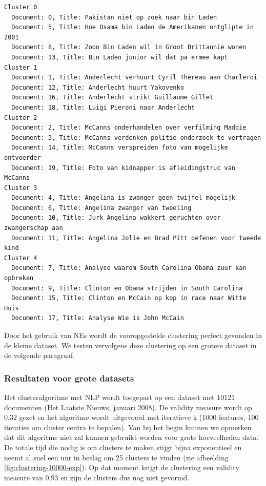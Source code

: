 \begin{lstlisting}
Cluster 0
  Document: 0, Title: Pakistan niet op zoek naar bin Laden
  Document: 5, Title: Hoe Osama bin Laden de Amerikanen ontglipte in 2001
  Document: 8, Title: Zoon Bin Laden wil in Groot Brittannie wonen
  Document: 13, Title: Bin Laden junior wil dat pa ermee kapt
Cluster 1
  Document: 1, Title: Anderlecht verhuurt Cyril Thereau aan Charleroi
  Document: 12, Title: Anderlecht huurt Yakovenko
  Document: 16, Title: Anderlecht strikt Guillaume Gillet
  Document: 18, Title: Luigi Pieroni naar Anderlecht
Cluster 2
  Document: 2, Title: McCanns onderhandelen over verfilming Maddie
  Document: 3, Title: McCanns verdenken politie onderzoek te vertragen
  Document: 14, Title: McCanns verspreiden foto van mogelijke ontvoerder
  Document: 19, Title: Foto van kidnapper is afleidingstruc van McCanns
Cluster 3
  Document: 4, Title: Angelina is zwanger geen twijfel mogelijk
  Document: 6, Title: Angelina zwanger van tweeling
  Document: 10, Title: Jurk Angelina wakkert geruchten over zwangerschap aan
  Document: 11, Title: Angelina Jolie en Brad Pitt oefenen voor tweede kind
Cluster 4
  Document: 7, Title: Analyse waarom South Carolina Obama zuur kan opbreken
  Document: 9, Title: Clinton en Obama strijden in South Carolina
  Document: 15, Title: Clinton en McCain op kop in race naar Witte Huis
  Document: 17, Title: Analyse Wie is John McCain
\end{lstlisting}

Door het gebruik van NEs wordt de vooropgestelde clustering perfect gevonden in de kleine dataset. We testen vervolgens deze clustering op een grotere dataset in de volgende paragraaf.

\subsubsection{Resultaten voor grote datasets}
Het clusteralgoritme met NLP wordt toegepast op een dataset met 10121 documenten (Het Laatste Nieuws, januari 2008). De validity measure wordt op 0,32 gezet en het algoritme wordt uitgevoerd met iteratieve k (1000 features, 100 iteraties om cluster centra te bepalen). Van bij het begin kunnen we opmerken dat dit algoritme niet zal kunnen gebruikt worden voor grote hoeveelheden data. De totale tijd die nodig is om clusters te maken stijgt bijna exponentieel en neemt al snel een uur in beslag om 25 clusters te vinden (zie afbeelding \ref{fig:clustering-10000-exp}). Op dat moment krijgt de clustering een validity measure van 0,93 en zijn de clusters dus nog niet gevormd.

